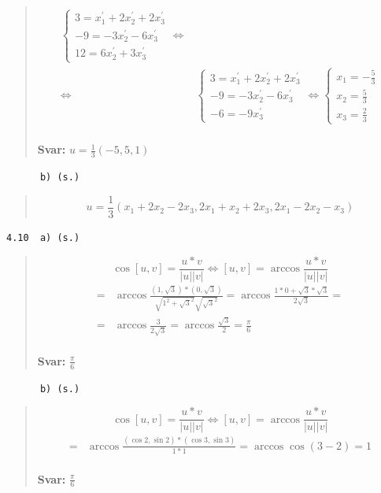 \documentclass[a4paper]{article}
\newcommand{\tskcol}[1]{\textcolor{tskcol}{#1}}
\begin{document}
\begin{quotation}
\begin{align*}
	\begin{cases}
	3=x^{'}_1+2x^{'}_2+2x^{'}_3 \\
	-9=-3x^{'}_2-6x^{'}_3 \\
	12=6x^{'}_2+3x^{'}_3
	\end{cases} \Leftrightarrow \\ \Leftrightarrow
	&\begin{cases}
	3=x^{'}_1+2x^{'}_2+2x^{'}_3 \\
	-9=-3x^{'}_2-6x^{'}_3 \\
	-6=-9x^{'}_3
	\end{cases} \Leftrightarrow
	\begin{cases}
	x_1=-\frac{5}{3} \\
	x_2=\frac{5}{3} \\
	x_3=\frac{2}{3}
	\end{cases}
	\end{align*}
	\\
	\textbf{Svar:} $u=\frac{1}{3}(-5,5,1)$
\end{quotation}

\texttt{\tskcol{~~~~~~b) (s.)}}
\begin{quotation}
	\noindent
	\[u=\frac{1}{3}(x_1+2x_2-2x_3,2x_1+x_2+2x_3,2x_1-2x_2-x_3)\]
\end{quotation}

\texttt{\tskcol{4.10~~a) (s.)}}
\begin{quotation}
	\noindent
	\[\cos[u,v]=\frac{u*v}{|u||v|} \Leftrightarrow
	[u,v]=\arccos\frac{u*v}{|u||v|}\]
	\begin{align*}
	[u,v]=&\arccos\frac{(1,\sqrt{3})*(0,\sqrt{3})}{\sqrt{1^2+\sqrt{3}^2}\sqrt{\sqrt{3}^2}}=
	\arccos\frac{1*0+\sqrt{3}*\sqrt{3}}{2\sqrt{3}}= \\ =
	&\arccos\frac{3}{2\sqrt{3}}=
	\arccos\frac{\sqrt{3}}{2}=
	\frac{\pi}{6}
	\end{align*}
	\\
	\textbf{Svar:} $\frac{\pi}{6}$
\end{quotation}

\texttt{\tskcol{~~~~~~b) (s.)}}
\begin{quotation}
	\noindent
	\[\cos[u,v]=\frac{u*v}{|u||v|} \Leftrightarrow
	[u,v]=\arccos\frac{u*v}{|u||v|}\]
	\begin{align*}
	[u,v]=&\arccos\frac{(\cos2,\sin2)*(\cos3,\sin3)}{1*1}=
	\arccos\cos(3-2)= 1
	\end{align*}
	\\
	\textbf{Svar:} $\frac{\pi}{6}$
\end{quotation}
\end{document}
